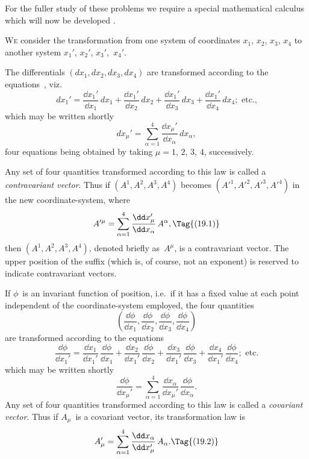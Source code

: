 \documentclass[12pt]{book}
\begin{document}
For the fuller study of these problems we require a special mathematical
calculus which will now be developed .


%
%

\lettrine{W}{e} consider the transformation from one system of coordinates $x_{1}$, $x_{2}$, $x_{3}$, $x_{4}$
%
to another system $x_{1}'$, $x_{2}'$, $x_{3}'$,~$x_{4}'$.

The differentials $(dx_{1}, dx_{2}, dx_{3}, dx_{4})$ are transformed according to the
equations~, viz.\
\[
dx_{1}' = \frac{\dd x_{1}'}{\dd x_{1}}\, dx_{1}
  + \frac{\dd x_{1}'}{\dd x_{2}}\, dx_{2}
  + \frac{\dd x_{1}'}{\dd x_{3}}\, dx_{3}
  + \frac{\dd x_{1}'}{\dd x_{4}}\, dx_{4}; \text{ etc.,}
\]
which may be written shortly
\[
dx_{\mu}' = \sum_{\alpha=1}^{4} \frac{\dd x_{\mu}'}{\dd x_{\alpha}}\, dx_{\alpha},
\]
four equations being obtained by taking $\mu = 1$, $2$, $3$, $4$, successively.

Any set of four quantities transformed according to this law is called
a \emph{contravariant vector}. Thus if $(A^{1}, A^{2}, A^{3}, A^{4})$ becomes $(A'^{1}, A'^{2}, A'^{3}, A'^{4})$ in
\index{Vector}%
the new coordinate-system, where
\[
A'^{\mu} =  \sum_{\alpha=1}^{4} \frac{\dd x_{\mu}'}{\dd x_{\alpha}}\, A^{\alpha},
\Tag{(19.1)}
\]
then $(A^{1}, A^{2}, A^{3}, A^{4})$, denoted briefly as~$A^{\mu}$, is a contravariant vector. The
upper position of the suffix (which is, of course, not an exponent) is reserved
to indicate contravariant vectors.

If $\phi$~is an invariant function of position, i.e.\ if it has a fixed value at each
point independent of the coordinate-system employed, the four quantities
\[
\left(\frac{\dd\phi}{\dd x_{1}},
      \frac{\dd\phi}{\dd x_{2}},
      \frac{\dd\phi}{\dd x_{3}},
      \frac{\dd\phi}{\dd x_{4}}\right)
\]
are transformed according to the equations
\[
\frac{\dd\phi}{\dd x_{1}'}
= \frac{\dd x_{1}}{\dd x_{1}'}\, \frac{\dd\phi}{\dd x_{1}}
+ \frac{\dd x_{2}}{\dd x_{1}'}\, \frac{\dd\phi}{\dd x_{2}}
+ \frac{\dd x_{3}}{\dd x_{1}'}\, \frac{\dd\phi}{\dd x_{3}}
+ \frac{\dd x_{4}}{\dd x_{1}'}\, \frac{\dd\phi}{\dd x_{4}}; \text{ etc.}
\]
which may be written shortly
\[
\frac{\dd\phi}{\dd x_{\mu}'}
= \sum_{\alpha=1}^{4} \frac{\dd x_{\alpha}}{\dd x_{\mu}'}\, \frac{\dd\phi}{\dd x_{\alpha}}.
\]
Any set of four quantities transformed according to this law is called a
\emph{covariant vector}. Thus if $A_{\mu}$~is a covariant vector, its transformation law is
\index{Covariant vector}%
\[
A_{\mu}' =  \sum_{\alpha=1}^{4} \frac{\dd x_{\alpha}}{\dd x_{\mu}'}\, A_{\alpha}.
\Tag{(19.2)}
\]
\end{document}
